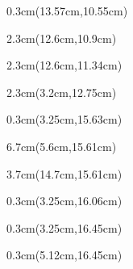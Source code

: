 \documentclass[a4paper]{article}
\begin{document}
\begin{Form}
\begin{textblock*}{0.3cm}(13.57cm,10.55cm) %
\noindent
\end{textblock*}

\begin{textblock*}{2.3cm}(12.6cm,10.9cm) %
\noindent
\Ueberstundenzahl
\end{textblock*}

\begin{textblock*}{2.3cm}(12.6cm,11.34cm) %
\noindent
\Ueberstundenausgleich
\end{textblock*}

\begin{textblock*}{2.3cm}(3.2cm,12.75cm) %
\noindent
\ArbeitstageProUrlaubsjahr
\end{textblock*}

\begin{textblock*}{0.3cm}(3.25cm,15.63cm) %
\noindent
\end{textblock*}

\begin{textblock*}{6.7cm}(5.6cm,15.61cm) %
\noindent
\Tarifvertrag
\end{textblock*}

\begin{textblock*}{3.7cm}(14.7cm,15.61cm) %
\noindent
\Entgeltgruppe
\end{textblock*}

\begin{textblock*}{0.3cm}(3.25cm,16.06cm) %
\noindent
\end{textblock*}

\begin{textblock*}{0.3cm}(3.25cm,16.45cm) %
\noindent
\end{textblock*}

\begin{textblock*}{0.3cm}(5.12cm,16.45cm) %
\noindent
\end{textblock*}


\end{Form}
\end{document}

